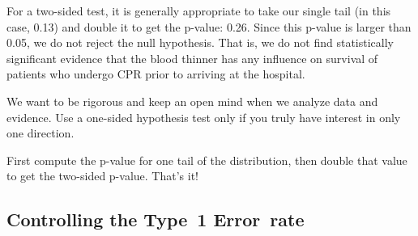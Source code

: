 For a two-sided test, it is generally appropriate to take our single tail (in this case, 0.13) and double it to get the p-value: 0.26. Since this p-value is larger than 0.05, we do not reject the null hypothesis. That is, we do not find statistically significant evidence that the blood thinner has any influence on survival of patients who undergo CPR prior to arriving at the hospital.


\begin{termBox}{
We want to be rigorous and keep an open mind when we analyze data and evidence. Use a one-sided hypothesis test only if you truly have interest in only one direction.}
\end{termBox}

\begin{termBox}{
First compute the p-value for one tail of the distribution, then double that value to get the two-sided p-value. That's it!}
\end{termBox}


\subsection{Controlling the Type~1 Error~rate}
\label{InflatingType1ErrorRate}

